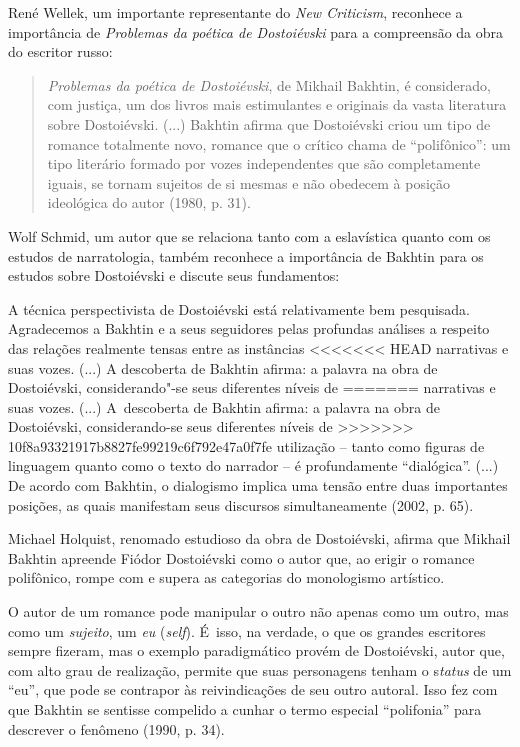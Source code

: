 {René Wellek, um importante representante do \emph{New Criticism},
reconhece a importância de \emph{Problemas da poética de Dostoiévski}
para a compreensão da obra do escritor russo:

\begin{quote}
\emph{Problemas da poética de Dostoiévski}, de Mikhail Bakhtin, é
considerado, com justiça, um dos livros mais estimulantes e originais da
vasta literatura sobre Dostoiévski. (...) Bakhtin afirma que Dostoiévski
criou um tipo de romance totalmente novo, romance que o crítico chama de
``polifônico'': um tipo literário formado por vozes independentes que
são completamente iguais, se tornam sujeitos de si mesmas e não obedecem
à posição ideológica do autor (1980, p. 31).
\end{quote}

Wolf Schmid, um autor que se relaciona tanto com a eslavística quanto
com os estudos de narratologia, também reconhece a importância de
Bakhtin para os estudos sobre Dostoiévski e discute seus fundamentos:

A técnica perspectivista de Dostoiévski está relativamente bem
pesquisada. Agradecemos a Bakhtin e a seus seguidores pelas profundas
análises a respeito das relações realmente tensas entre as instâncias
<<<<<<< HEAD
narrativas e suas vozes. (...) A descoberta de Bakhtin afirma: a palavra
na obra de Dostoiévski, considerando"-se seus diferentes níveis de
=======
narrativas e suas vozes. (...) A~descoberta de Bakhtin afirma: a palavra
na obra de Dostoiévski, considerando-se seus diferentes níveis de
>>>>>>> 10f8a93321917b8827fe99219c6f792e47a0f7fe
utilização -- tanto como figuras de linguagem quanto como o texto do
narrador -- é profundamente ``dialógica''. (...) De acordo com Bakhtin,
o dialogismo implica uma tensão entre duas importantes posições, as
quais manifestam seus discursos simultaneamente (2002, p. 65).

Michael Holquist, renomado estudioso da obra de Dostoiévski, afirma que
Mikhail Bakhtin apreende Fiódor Dostoiévski como o autor que, ao erigir
o romance polifônico, rompe com e supera as categorias do monologismo
artístico.

O autor de um romance pode manipular o outro não apenas como um outro,
mas como um \emph{sujeito}, um \emph{eu} (\emph{self}). É~isso, na
verdade, o que os grandes escritores sempre fizeram, mas o exemplo
paradigmático provém de Dostoiévski, autor que, com alto grau de
realização, permite que suas personagens tenham o s\emph{tatus} de um
``eu'', que pode se contrapor às reivindicações de seu outro autoral.
Isso fez com que Bakhtin se sentisse compelido a cunhar o termo especial
``polifonia'' para descrever o fenômeno (1990, p. 34).

}

